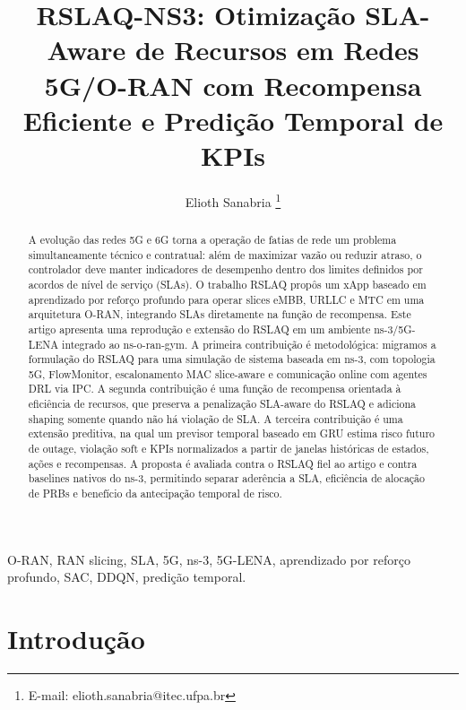 \documentclass[10pt,a4paper]{IEEEtran}
\title{RSLAQ-NS3: Otimiza\c{c}\~{a}o SLA-Aware de Recursos em Redes
       5G/O-RAN com Recompensa Eficiente e Predi\c{c}\~{a}o
       Temporal de KPIs}
\author{Elioth Sanabria%
        \thanks{E-mail: elioth.sanabria@itec.ufpa.br}}
\begin{document}
\maketitle

\begin{abstract}
A evolu\c{c}\~{a}o das redes 5G e 6G torna a opera\c{c}\~{a}o de
fatias de rede um problema simultaneamente t\'{e}cnico e
contratual: al\'{e}m de maximizar vaz\~{a}o ou reduzir atraso, o
controlador deve manter indicadores de desempenho dentro dos
limites definidos por acordos de n\'{i}vel de servi\c{c}o
(SLAs). O trabalho RSLAQ prop\^{o}s um xApp baseado em
aprendizado por refor\c{c}o profundo para operar slices eMBB,
URLLC e MTC em uma arquitetura O-RAN, integrando SLAs
diretamente na fun\c{c}\~{a}o de recompensa. Este artigo
apresenta uma reprodu\c{c}\~{a}o e extens\~{a}o do RSLAQ em um
ambiente ns-3/5G-LENA integrado ao ns-o-ran-gym. A primeira
contribui\c{c}\~{a}o \'{e} metodol\'{o}gica: migramos a
formula\c{c}\~{a}o do RSLAQ para uma simula\c{c}\~{a}o de
sistema baseada em ns-3, com topologia 5G, FlowMonitor,
escalonamento MAC slice-aware e comunica\c{c}\~{a}o online com
agentes DRL via IPC. A segunda contribui\c{c}\~{a}o \'{e} uma
fun\c{c}\~{a}o de recompensa orientada \`{a} efici\^{e}ncia de
recursos, que preserva a penaliza\c{c}\~{a}o SLA-aware do RSLAQ
e adiciona shaping somente quando n\~{a}o h\'{a}
viola\c{c}\~{a}o de SLA. A terceira contribui\c{c}\~{a}o
\'{e} uma extens\~{a}o preditiva, na qual um previsor temporal
baseado em GRU estima risco futuro de outage, viola\c{c}\~{a}o
soft e KPIs normalizados a partir de janelas hist\'{o}ricas de
estados, a\c{c}\~{o}es e recompensas. A proposta \'{e} avaliada
contra o RSLAQ fiel ao artigo e contra baselines nativos do
ns-3, permitindo separar ader\^{e}ncia a SLA, efici\^{e}ncia de
aloca\c{c}\~{a}o de PRBs e benef\'{i}cio da antecipa\c{c}\~{a}o
temporal de risco.
\end{abstract}

\begin{IEEEkeywords}
O-RAN, RAN slicing, SLA, 5G, ns-3, 5G-LENA, aprendizado por
refor\c{c}o profundo, SAC, DDQN, predi\c{c}\~{a}o temporal.
\end{IEEEkeywords}

\section{Introdu\c{c}\~{a}o}
\label{sec:intro}
\end{document}

